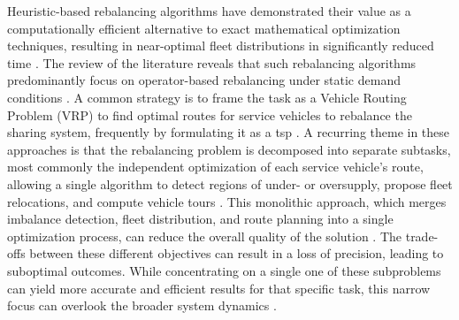 Heuristic-based rebalancing algorithms have demonstrated their value as a computationally efficient alternative to exact mathematical optimization techniques, resulting in near-optimal fleet distributions in significantly reduced time \cite{shen_enhancing_2024, kim_optimal_2023}.
The review of the literature reveals that such rebalancing algorithms predominantly focus on operator-based rebalancing under static demand conditions \cite{shen_enhancing_2024, kim_optimal_2023, tolomei_benefits_2021, sessa_online_2021}.
A common strategy is to frame the task as a Vehicle Routing Problem (VRP) to find optimal routes for service vehicles to rebalance the sharing system, frequently by formulating it as a \gls{tsp} \cite{wu_challenges_2020, shen_enhancing_2024}.
A recurring theme in these approaches is that the rebalancing problem is decomposed into separate subtasks, most commonly the independent optimization of each service vehicle's route, allowing a single algorithm to detect regions of under- or oversupply, propose fleet relocations, and compute vehicle tours \cite{shen_enhancing_2024}.
This monolithic approach, which merges imbalance detection, fleet distribution, and route planning into a single optimization process, can reduce the overall quality of the solution \cite{zou_relocation_2025}.
The trade-offs between these different objectives can result in a loss of precision, leading to suboptimal outcomes.
While concentrating on a single one of these subproblems can yield more accurate and efficient results for that specific task, this narrow focus can overlook the broader system dynamics \cite{wu_challenges_2020, zou_relocation_2025}.
\\

